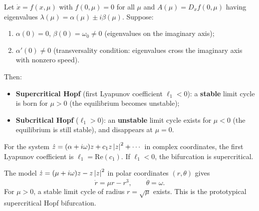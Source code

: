 \begin{theorem}[Hopf]
\label{thm:hopf}
Let $\dot{x} = f(x, \mu)$ with $f(0, \mu) = 0$ for all $\mu$ and
$A(\mu) = D_x f(0, \mu)$ having eigenvalues
$\lambda(\mu) = \alpha(\mu) \pm i\beta(\mu)$. Suppose:
\begin{enumerate}
    \item $\alpha(0) = 0$, $\beta(0) = \omega_0 \neq 0$ (eigenvalues on
    the imaginary axis);
    \item $\alpha'(0) \neq 0$ (transversality condition: eigenvalues cross
    the imaginary axis with nonzero speed).
\end{enumerate}
Then:
\begin{itemize}
    \item \textbf{Supercritical Hopf} (first Lyapunov coefficient
    $\ell_1 < 0$): a \textbf{stable} limit cycle is born for $\mu > 0$
    (the equilibrium becomes unstable);
    \item \textbf{Subcritical Hopf} ($\ell_1 > 0$): an \textbf{unstable}
    limit cycle exists for $\mu < 0$ (the equilibrium is still stable),
    and disappears at $\mu = 0$.
\end{itemize}
\end{theorem}

\begin{keyformulas}[title=\textbf{First Lyapunov coefficient}]
For the system $\dot{z} = (\alpha + i\omega)z + c_1 z\left| z \right|^2 + \cdots$
in complex coordinates, the first Lyapunov coefficient is
$\ell_1 = \text{Re}(c_1)$. If $\ell_1 < 0$, the bifurcation is supercritical.
\end{keyformulas}

\begin{example}
The model $\dot{z} = (\mu + i\omega)z - z\left| z \right|^2$ in polar coordinates
$(r, \theta)$ gives
\[
    \dot{r} = \mu r - r^3, \qquad \dot{\theta} = \omega.
\]
For $\mu > 0$, a stable limit cycle of radius $r = \sqrt{\mu}$ exists.
This is the prototypical supercritical Hopf bifurcation.
\end{example}

